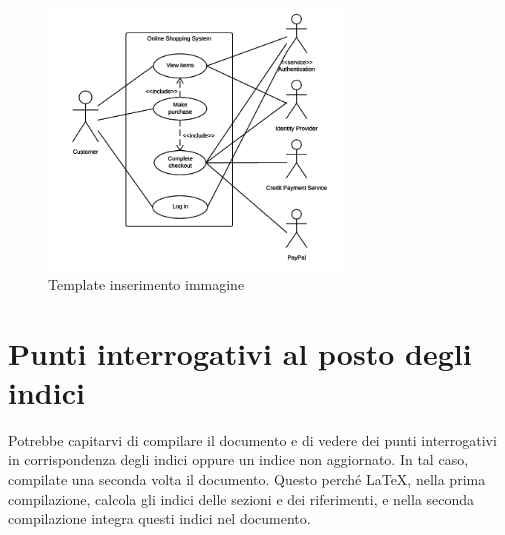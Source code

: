 \begin{figure}
	\centering
	\includegraphics[width=0.7\textwidth]{imgs/file-comuni-ai-gruppi/useCaseEsempio.png}
	\caption{Template inserimento immagine}
	\label{fig:template-inserimento-immagine}
\end{figure}

\section{Punti interrogativi al posto degli indici}

Potrebbe capitarvi di compilare il documento e di vedere dei punti interrogativi in corrispondenza degli indici oppure un indice non aggiornato. In tal caso, compilate una seconda volta il documento. Questo perché \LaTeX , nella prima compilazione, calcola gli indici delle sezioni e dei riferimenti, e nella seconda compilazione integra questi indici nel documento.

\clearpage